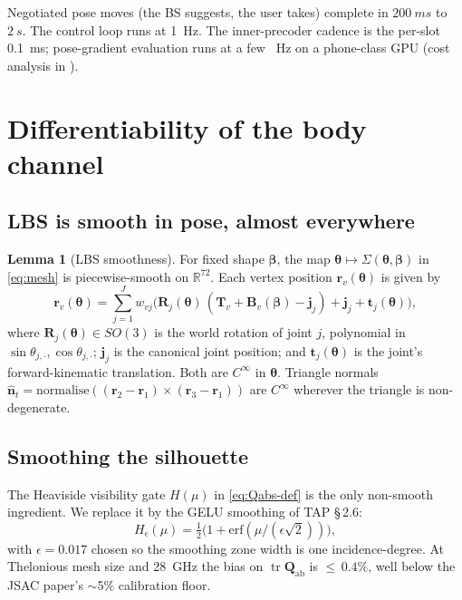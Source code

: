 \documentclass[11pt,a4paper]{article}
\theoremstyle{definition}
\newtheorem{lemma}[lemma]{Lemma}
\newcommand{\nhat}{\hat{\bm{n}}}
\newcommand{\rr}{\mathbf{r}}
\DeclareMathOperator{\tr}{tr}
\newcommand{\Reals}{\mathbb{R}}
\newcommand{\half}{\tfrac{1}{2}}
\newcommand{\Qabs}{\mathbf{Q}_{\mathrm{ab}}}
\newcommand{\thetab}{\bm{\theta}}
\newcommand{\betab}{\bm{\beta}}
\begin{document}
Negotiated pose moves (the BS suggests, the user takes) complete in
$\SI{200}{ms}$ to $\SI{2}{s}$.  The control loop runs at
\SI{1}{Hz}.  The inner-precoder cadence is the per-slot
\SI{0.1}{ms}; pose-gradient evaluation runs at a few \SI{}{Hz} on a
phone-class GPU (cost analysis in ).

\section{Differentiability of the body channel}\label{sec:diff}

\subsection{LBS is smooth in pose, almost everywhere}

\begin{lemma}[LBS smoothness]\label{lem:lbs-smooth}
For fixed shape $\betab$, the map $\thetab\mapsto\Sigma(\thetab,
\betab)$ in \eqref{eq:mesh} is piecewise-smooth on $\Reals^{72}$.
Each vertex position $\rr_v(\thetab)$ is given by
\begin{equation}\label{eq:lbs-eq}
  \rr_v(\thetab)
  =\sum_{j=1}^{J}w_{vj}\bigl(\mathbf{R}_j(\thetab)\,
                              (\mathbf{T}_v+\mathbf{B}_v(\betab)
                                              -\mathbf{j}_j)
                              +\mathbf{j}_j+\mathbf{t}_j(\thetab)\bigr),
\end{equation}
where $\mathbf{R}_j(\thetab)\in SO(3)$ is the world rotation of
joint $j$, polynomial in $\sin\theta_{j,\cdot},\cos\theta_{j,\cdot}$;
$\mathbf{j}_j$ is the canonical joint position; and
$\mathbf{t}_j(\thetab)$ is the joint's forward-kinematic
translation.  Both are $C^\infty$ in $\thetab$.  Triangle normals
$\nhat_t=\mathrm{normalise}((\rr_2-\rr_1)\times(\rr_3-\rr_1))$ are
$C^\infty$ wherever the triangle is non-degenerate.
\end{lemma}

\subsection{Smoothing the silhouette}\label{sec:gelu}

The Heaviside visibility gate $H(\mu)$ in \eqref{eq:Qabs-def} is the
only non-smooth ingredient.  We replace it by the GELU smoothing of
TAP \S\,2.6:
\begin{equation}\label{eq:gelu}
  H_\epsilon(\mu)=\half\bigl(1+\mathrm{erf}(\mu/(\epsilon\sqrt{2}))\bigr),
\end{equation}
with $\epsilon=0.017$ chosen so the smoothing zone width is one
incidence-degree.  At Thelonious mesh size and \SI{28}{GHz} the
bias on $\tr\Qabs$ is $\le$\,$0.4\%$, well below the JSAC paper's
$\sim$5\% calibration floor.
\end{document}
